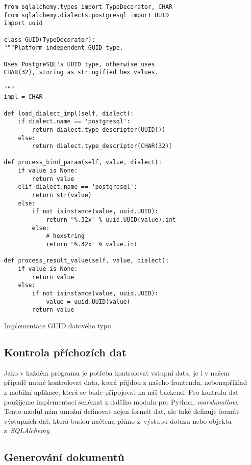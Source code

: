 \begin{listing}
    \begin{verbatim}
from sqlalchemy.types import TypeDecorator, CHAR
from sqlalchemy.dialects.postgresql import UUID
import uuid

class GUID(TypeDecorator):
"""Platform-independent GUID type.

Uses PostgreSQL's UUID type, otherwise uses
CHAR(32), storing as stringified hex values.

"""
impl = CHAR

def load_dialect_impl(self, dialect):
    if dialect.name == 'postgresql':
        return dialect.type_descriptor(UUID())
    else:
        return dialect.type_descriptor(CHAR(32))

def process_bind_param(self, value, dialect):
    if value is None:
        return value
    elif dialect.name == 'postgresql':
        return str(value)
    else:
        if not isinstance(value, uuid.UUID):
            return "%.32x" % uuid.UUID(value).int
        else:
            # hexstring
            return "%.32x" % value.int

def process_result_value(self, value, dialect):
    if value is None:
        return value
    else:
        if not isinstance(value, uuid.UUID):
            value = uuid.UUID(value)
        return value
    \end{verbatim}
    \caption{Implementace GUID datového typu}
    \label{lst:guidImplementation}
\end{listing}

\subsection{Kontrola příchozích dat}

Jako v každém programu je potřeba kontrolovat vstupní data, je i v našem případě nutné kontrolovat data, která přijdou z našeho frontendu, nebo\linebreak například z mobilní aplikace,
která se bude připojovat na náš backend. Pro kontrolu dat použijeme implementaci schémat z dalšího modulu pro Python, \textit{marshmallow}. Tento modul nám umožní definovat
nejen formát dat, ale také definuje formát výstupních dat, která budou načtena přímo z~výstupu dotazu nebo objektu z~\textit{SQLAlchemy}.

\subsection{Generování dokumentů}

